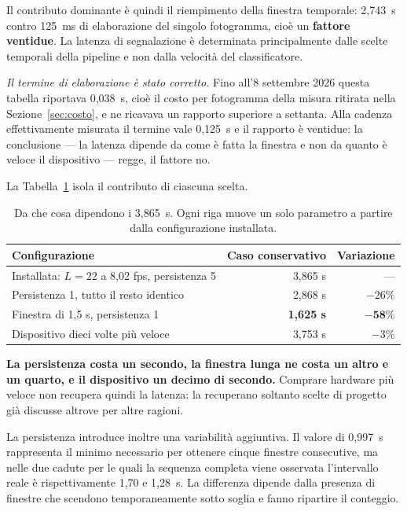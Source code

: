 Il contributo dominante è quindi il riempimento della finestra temporale: 2,743~s contro 125~ms di elaborazione del singolo fotogramma, cioè un \textbf{fattore ventidue}. La latenza di segnalazione è determinata principalmente dalle scelte temporali della pipeline e non dalla velocità del classificatore.

\emph{Il termine di elaborazione è stato corretto.} Fino all'8 settembre 2026 questa tabella riportava 0,038~s, cioè il costo per fotogramma della misura ritirata nella Sezione~\ref{sec:costo}, e ne ricavava un rapporto superiore a settanta. Alla cadenza effettivamente misurata il termine vale 0,125~s e il rapporto è ventidue: la conclusione --- la latenza dipende da come è fatta la finestra e non da quanto è veloce il dispositivo --- regge, il fattore no.

La Tabella~\ref{tab:latenza_sensibilita} isola il contributo di ciascuna scelta.

\begin{table}[ht]
\centering
\caption{Da che cosa dipendono i 3,865~s. Ogni riga muove un solo parametro a
partire dalla configurazione installata.}
\label{tab:latenza_sensibilita}
\begin{tabular}{lrr}
\toprule
\textbf{Configurazione} & \textbf{Caso conservativo} & \textbf{Variazione} \\
\midrule
Installata: $L=22$ a 8,02 fps, persistenza 5 & 3,865 s & --- \\
Persistenza 1, tutto il resto identico & 2,868 s & $-26\%$ \\
Finestra di 1,5 s, persistenza 1 & \textbf{1,625 s} & $\mathbf{-58\%}$ \\
Dispositivo dieci volte più veloce & 3,753 s & $-3\%$ \\
\bottomrule
\end{tabular}
\end{table}

\textbf{La persistenza costa un secondo, la finestra lunga ne costa un altro e un quarto, e il dispositivo un decimo di secondo.} Comprare hardware più veloce non recupera quindi la latenza: la recuperano soltanto scelte di progetto già discusse altrove per altre ragioni.

La persistenza introduce inoltre una variabilità aggiuntiva. Il valore di 0,997~s rappresenta il minimo necessario per ottenere cinque finestre consecutive, ma nelle due cadute per le quali la sequenza completa viene osservata l'intervallo reale è rispettivamente 1,70 e 1,28~s. La differenza dipende dalla presenza di finestre che scendono temporaneamente sotto soglia e fanno ripartire il conteggio.

